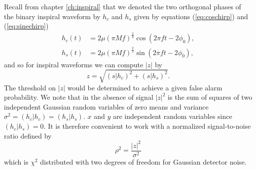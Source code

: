 Recall from chapter \ref{ch:inspiral} that we denoted the two orthogonal
phases of the binary inspiral waveform by $h_c$ and $h_s$ given by equations
(\ref{eq:coschirp}) and (\ref{eq:sinechirp})
\begin{align}
h_c(t) & = 2\mu (\pi M f)^{\frac{2}{3}} \cos(2\pi f t - 2\phi_0), \\
h_s(t) & = 2\mu (\pi M f)^{\frac{2}{3}} \sin(2\pi f t - 2\phi_0),
\end{align}
and so for inspiral waveforms we can compute $|z|$ by
\begin{equation}
z = \sqrt{(s|h_c)^2 + (s|h_s)^2}.
\end{equation}
The threshold on $|z|$ would be determined to achieve a given false alarm
probability. We note that in the absence of signal $|z|^2$ is the sum of
squares of two independent Gaussian random variables of zero means and
variance $\sigma^2 = (h_c|h_c) = (h_s|h_s)$. $x$ and $y$ are independent
random variables since $(h_c|h_s) = 0$. It is therefore convenient to work
with a normalized signal-to-noise ratio defined by
\begin{equation}
\rho^2 = \frac{|z|^2}{\sigma^2}
\label{eq:snrrootdef}
\end{equation}
which is $\chi^2$ distributed with two degrees of freedom for Gaussian
detector noise.

